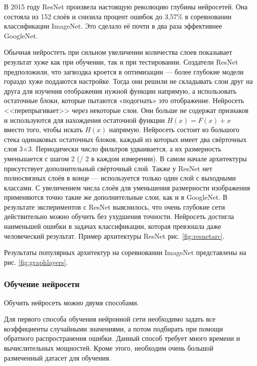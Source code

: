 \documentclass[a4paper,14pt]{article}
\begin{document}
	В 2015 году ResNet произвела настоящую революцию глубины нейросетей.
	Она состояла из 152 слоёв и снизила процент ошибок до 3,57\% в соревновании классификации ImageNet.
	Это сделало её почти в два раза эффективнее GoogleNet.
	
	Обычная нейростеть при сильном увеличении количества слоев показывает результат хуже как при обучении, так и при тестировании.
	Создатели ResNet предположили, что загвоздка кроется в оптимизации — более глубокие модели гораздо хуже поддаются настройке.
	Тогда они решили не складывать слои друг на друга для изучения отображения нужной функции напрямую, а использовать остаточные блоки, которые пытаются «подогнать» это отображение.
	Нейросеть <<перепрыгивает>> через некоторые слои.
	Они больше не содержат признаков и используются для нахождения остаточной функции $H(x) = F(x) + x$ вместо того, чтобы искать $H(x)$ напрямую.
	Нейросеть состоит из большого стека одинаковых остаточных блоков, каждый из которых имеет два свёрточных слоя 3×3.
	Периодически число фильтров удваивается, а их размерность уменьшается с шагом 2 (/ 2 в каждом измерении).
	В самом начале архитектуры присутствует дополнительный свёрточный слой.
	Также у ResNet нет полносвязных слоёв в конце — используется только один слой с выходными классами.
	С увеличением числа слоёв для уменьшения размерности изображения применяются точно такие же дополнительные слои, как и в GoogleNet. 
	В результате экспериментов с ResNet выяснилось, что очень глубокие сети действительно можно обучить без ухудшения точности.
	Нейросеть достигла наименьшей ошибки в задачах классификации, которая превзошла даже человеческий результат.
	Пример архитектуры ResNet рис. \ref{fig:resnetarc}.
	
	Результаты популярных архитектур на соревновании ImageNet представлены на рис. \ref{fig:graphlayers}.
	
	
	\subsubsection{Обучение нейросети}
	
	Обучить нейросеть можно двумя способами.
	
	Для первого способа обучения нейронной сети необходимо задать все коэффициенты случайными значениями, а потом подбирать при помощи обратного распространения ошибки.
	Данный способ требует много времени и вычислительных мощностей.
	Кроме этого, необходим очень большой размеченный датасет для обучения.
	
\end{document}
